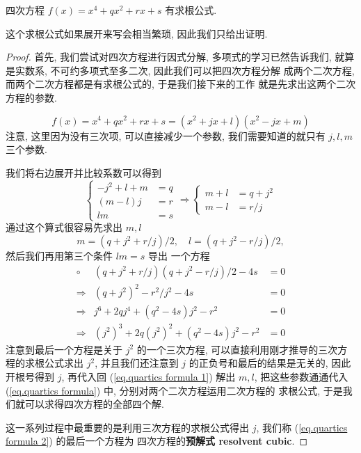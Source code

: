 \documentclass[UTF8]{book}
\begin{document}
\begin{theorem}
    四次方程 $ f(x)=x^4 + qx^2 + rx + s $ 有求根公式. 
\end{theorem}

这个求根公式如果展开来写会相当繁琐, 因此我们只给出证明. 

\begin{proof}
    首先, 我们尝试对四次方程进行因式分解, 多项式的学习已然告诉我们, 
    就算是实数系, 不可约多项式至多二次, 因此我们可以把四次方程分解
    成两个二次方程, 而两个二次方程都是有求根公式的, 于是我们接下来的工作
    就是先求出这两个二次方程的参数. 

    \begin{equation}\label{eq.quartics formula}
        f(x)=x^4 + qx^2 + rx + s = (x^2+jx+l)(x^2-jx+m)
    \end{equation}
    注意, 这里因为没有三次项, 可以直接减少一个参数, 我们需要知道的就只有 
    $j,l,m$ 三个参数. 

    我们将右边展开并比较系数可以得到
    \begin{equation}
        \begin{cases}
            - j^2 + l + m &= q \\
            (m - l)j &= r\\
            lm &= s
        \end{cases}
        \Rightarrow
        \begin{cases}
            m+l &= q + j^2 \\
            m-l &= r/j
        \end{cases}
    \end{equation}
    通过这个算式很容易先求出 $m,l$ 
    \begin{equation} \label{eq.quartics formula 1}
        m = (q+j^2+r/j)/2,\quad l = (q+j^2-r/j)/2, 
    \end{equation}
    然后我们再用第三个条件 $lm = s$ 导出
    一个方程
    \begin{equation} \label{eq.quartics formula 2}
        \begin{aligned}
            \circ &(q+j^2+r/j)(q+j^2-r/j)/2-4s &= 0 \\
            \Rightarrow &(q+j^2)^2-r^2/j^2-4s &= 0 \\
            \Rightarrow &j^6 + 2qj^4 +(q^2-4s)j^2 -r^2 &= 0\\
            \Rightarrow &(j^2)^3 + 2q (j^2)^2 + (q^2-4s)j^2 -r^2 &= 0
        \end{aligned}
    \end{equation}
    注意到最后一个方程是关于 $j^2$ 的一个三次方程, 
    可以直接利用刚才推导的三次方程的求根公式求出 $j^2$, 并且我们还注意到 
    $j$ 的正负号和最后的结果是无关的, 因此开根号得到 $j$, 再代入回 
    (\ref{eq.quartics formula 1}) 解出 $m,l$, 把这些参数通通代入 
    (\ref{eq.quartics formula}) 中, 分别对两个二次方程运用二次方程的
    求根公式, 于是我们就可以求得四次方程的全部四个解. 

    这一系列过程中最重要的是利用三次方程的求根公式得出 $j$, 
    我们称 (\ref{eq.quartics formula 2}) 的最后一个方程为
    四次方程的\textbf{预解式 resolvent cubic}. 
\end{proof}
\end{document}
